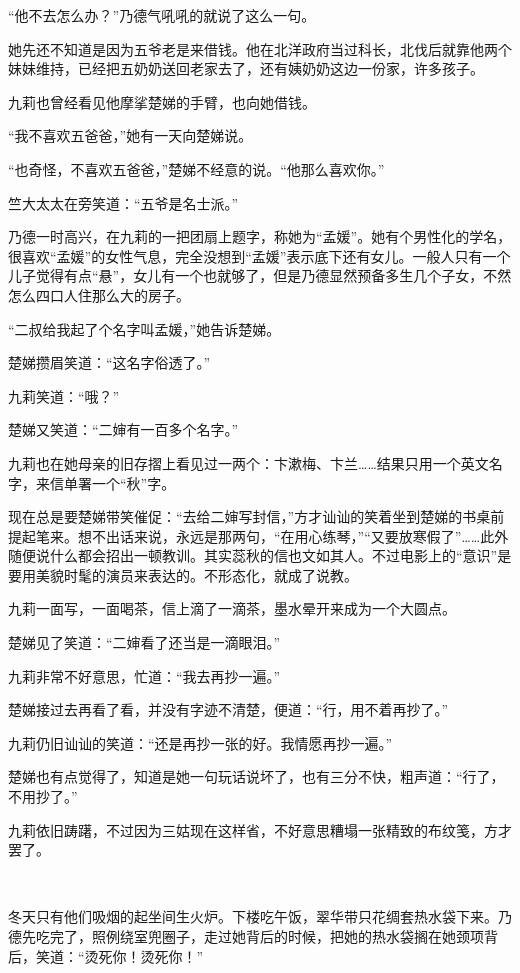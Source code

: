 \par “他不去怎么办？”乃德气吼吼的就说了这么一句。
\par 她先还不知道是因为五爷老是来借钱。他在北洋政府当过科长，北伐后就靠他两个妹妹维持，已经把五奶奶送回老家去了，还有姨奶奶这边一份家，许多孩子。
\par 九莉也曾经看见他摩挲楚娣的手臂，也向她借钱。
\par “我不喜欢五爸爸，”她有一天向楚娣说。
\par “也奇怪，不喜欢五爸爸，”楚娣不经意的说。“他那么喜欢你。”
\par 竺大太太在旁笑道：“五爷是名士派。”
\par 乃德一时高兴，在九莉的一把团扇上题字，称她为“孟媛”。她有个男性化的学名，很喜欢“孟媛”的女性气息，完全没想到“孟媛”表示底下还有女儿。一般人只有一个儿子觉得有点“悬”，女儿有一个也就够了，但是乃德显然预备多生几个子女，不然怎么四口人住那么大的房子。
\par “二叔给我起了个名字叫孟媛，”她告诉楚娣。
\par 楚娣攒眉笑道：“这名字俗透了。”
\par 九莉笑道：“哦？”
\par 楚娣又笑道：“二婶有一百多个名字。”
\par 九莉也在她母亲的旧存摺上看见过一两个：卞漱梅、卞兰……结果只用一个英文名字，来信单署一个“秋”字。
\par 现在总是要楚娣带笑催促：“去给二婶写封信，”方才讪讪的笑着坐到楚娣的书桌前提起笔来。想不出话来说，永远是那两句，“在用心练琴，”“又要放寒假了”……此外随便说什么都会招出一顿教训。其实蕊秋的信也文如其人。不过电影上的“意识”是要用美貌时髦的演员来表达的。不形态化，就成了说教。
\par 九莉一面写，一面喝茶，信上滴了一滴茶，墨水晕开来成为一个大圆点。
\par 楚娣见了笑道：“二婶看了还当是一滴眼泪。”
\par 九莉非常不好意思，忙道：“我去再抄一遍。”
\par 楚娣接过去再看了看，并没有字迹不清楚，便道：“行，用不着再抄了。”
\par 九莉仍旧讪讪的笑道：“还是再抄一张的好。我情愿再抄一遍。”
\par 楚娣也有点觉得了，知道是她一句玩话说坏了，也有三分不快，粗声道：“行了，不用抄了。”
\par 九莉依旧踌躇，不过因为三姑现在这样省，不好意思糟塌一张精致的布纹笺，方才罢了。
\par  
\par 冬天只有他们吸烟的起坐间生火炉。下楼吃午饭，翠华带只花绸套热水袋下来。乃德先吃完了，照例绕室兜圈子，走过她背后的时候，把她的热水袋搁在她颈项背后，笑道：“烫死你！烫死你！”
